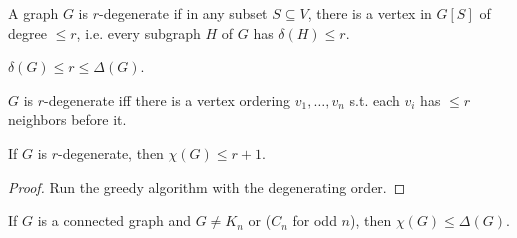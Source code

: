 \begin{definition}
    A graph \(G\) is \(r\)-degenerate if in any subset \(S \subseteq V\), there is a vertex in \(G[S]\) of degree \(\le r\), i.e. every subgraph \(H\) of \(G\) has \(\delta (H) \le r\).       
\end{definition}

\begin{observation}
    \(\delta (G) \le r \le \Delta (G)\). 
\end{observation}

\begin{remark}
    \(G\) is \(r\)-degenerate iff there is a vertex ordering \(v_1, \dots , v_n\) s.t. each \(v_i\) has \(\le r\) neighbors before it.     
\end{remark}

\begin{proposition}
    If \(G\) is \(r\)-degenerate, then \(\chi (G) \le r + 1\).   
\end{proposition}
\begin{proof}
    Run the greedy algorithm with the degenerating order. 
\end{proof}

\begin{theorem}
    If \(G\) is a connected graph and \(G \neq K_n\) or (\(C_n\) for odd \(n\)), then \(\chi (G) \le \Delta (G)\).     
\end{theorem}